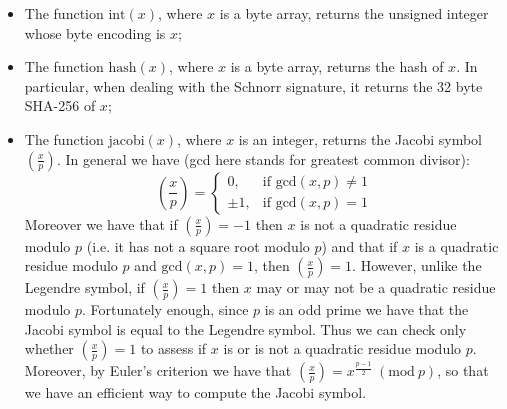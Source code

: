 \begin{itemize}
\begin{itemize}
		\item The function $\text{int}(x)$, where $x$ is a byte array, returns the unsigned integer whose byte encoding is $x$;
		\item The function $\text{hash}(x)$, where $x$ is a byte array, returns the hash of $x$. In particular, when dealing with the Schnorr signature, it returns the 32 byte SHA-256 of $x$;
		\item The function $\text{jacobi}(x)$, where $x$ is an integer, returns the Jacobi symbol $\left(\frac{x}{p}\right)$. In general we have (gcd here stands for greatest common divisor): $$\left(\frac{x}{p}\right)= \begin{cases} 0, & \text{if gcd}(x, p) \neq 1 \\ \pm 1, & \mbox{if gcd}(x, p) = 1 \end{cases}$$
		Moreover we have that if $\left(\frac{x}{p}\right) = - 1$ then $x$ is not a quadratic residue modulo $p$ (i.e. it has not a square root modulo $p$) and that if $x$ is a quadratic residue modulo $p$ and $\text{gcd}(x, p) = 1$, then $\left(\frac{x}{p}\right) = 1$. However, unlike the Legendre symbol, if $\left(\frac{x}{p}\right) = 1$ then $x$ may or may not be a quadratic residue modulo $p$. Fortunately enough, since $p$ is an odd prime we have that the Jacobi symbol is equal to the Legendre symbol. Thus we can check only whether $\left(\frac{x}{p}\right) = 1$ to assess if $x$ is or is not a quadratic residue modulo $p$.
		\\
		Moreover, by Euler's criterion we have that $\left(\frac{x}{p}\right) = x^{\frac{p - 1}{2}} \ (\text{mod} \ p)$, so that we have an efficient way to compute the Jacobi symbol.
	\end{itemize}	
\end{itemize}
